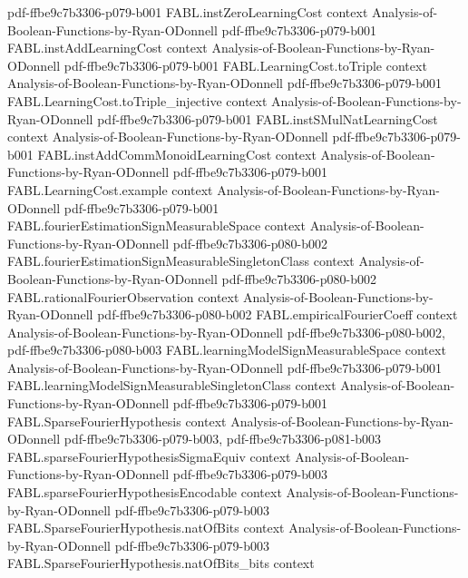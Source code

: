 \begin{theorem}
  {pdf-ffbe9c7b3306-p079-b001}
\proofstep
  {FABL.instZeroLearningCost}
  {context}
  {Analysis-of-Boolean-Functions-by-Ryan-ODonnell}
  {pdf-ffbe9c7b3306-p079-b001}
\proofstep
  {FABL.instAddLearningCost}
  {context}
  {Analysis-of-Boolean-Functions-by-Ryan-ODonnell}
  {pdf-ffbe9c7b3306-p079-b001}
\proofstep
  {FABL.LearningCost.toTriple}
  {context}
  {Analysis-of-Boolean-Functions-by-Ryan-ODonnell}
  {pdf-ffbe9c7b3306-p079-b001}
\proofstep
  {FABL.LearningCost.toTriple_injective}
  {context}
  {Analysis-of-Boolean-Functions-by-Ryan-ODonnell}
  {pdf-ffbe9c7b3306-p079-b001}
\proofstep
  {FABL.instSMulNatLearningCost}
  {context}
  {Analysis-of-Boolean-Functions-by-Ryan-ODonnell}
  {pdf-ffbe9c7b3306-p079-b001}
\proofstep
  {FABL.instAddCommMonoidLearningCost}
  {context}
  {Analysis-of-Boolean-Functions-by-Ryan-ODonnell}
  {pdf-ffbe9c7b3306-p079-b001}
\proofstep
  {FABL.LearningCost.example}
  {context}
  {Analysis-of-Boolean-Functions-by-Ryan-ODonnell}
  {pdf-ffbe9c7b3306-p079-b001}
\proofstep
  {FABL.fourierEstimationSignMeasurableSpace}
  {context}
  {Analysis-of-Boolean-Functions-by-Ryan-ODonnell}
  {pdf-ffbe9c7b3306-p080-b002}
\proofstep
  {FABL.fourierEstimationSignMeasurableSingletonClass}
  {context}
  {Analysis-of-Boolean-Functions-by-Ryan-ODonnell}
  {pdf-ffbe9c7b3306-p080-b002}
\proofstep
  {FABL.rationalFourierObservation}
  {context}
  {Analysis-of-Boolean-Functions-by-Ryan-ODonnell}
  {pdf-ffbe9c7b3306-p080-b002}
\proofstep
  {FABL.empiricalFourierCoeff}
  {context}
  {Analysis-of-Boolean-Functions-by-Ryan-ODonnell}
  {pdf-ffbe9c7b3306-p080-b002,
    pdf-ffbe9c7b3306-p080-b003}
\proofstep
  {FABL.learningModelSignMeasurableSpace}
  {context}
  {Analysis-of-Boolean-Functions-by-Ryan-ODonnell}
  {pdf-ffbe9c7b3306-p079-b001}
\proofstep
  {FABL.learningModelSignMeasurableSingletonClass}
  {context}
  {Analysis-of-Boolean-Functions-by-Ryan-ODonnell}
  {pdf-ffbe9c7b3306-p079-b001}
\proofstep
  {FABL.SparseFourierHypothesis}
  {context}
  {Analysis-of-Boolean-Functions-by-Ryan-ODonnell}
  {pdf-ffbe9c7b3306-p079-b003,
    pdf-ffbe9c7b3306-p081-b003}
\proofstep
  {FABL.sparseFourierHypothesisSigmaEquiv}
  {context}
  {Analysis-of-Boolean-Functions-by-Ryan-ODonnell}
  {pdf-ffbe9c7b3306-p079-b003}
\proofstep
  {FABL.sparseFourierHypothesisEncodable}
  {context}
  {Analysis-of-Boolean-Functions-by-Ryan-ODonnell}
  {pdf-ffbe9c7b3306-p079-b003}
\proofstep
  {FABL.SparseFourierHypothesis.natOfBits}
  {context}
  {Analysis-of-Boolean-Functions-by-Ryan-ODonnell}
  {pdf-ffbe9c7b3306-p079-b003}
\proofstep
  {FABL.SparseFourierHypothesis.natOfBits_bits}
  {context}

\end{theorem}
